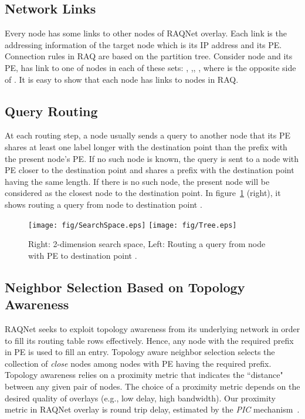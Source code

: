 \documentclass {article}
\begin{document}
\subsection{Network Links}
Every node has some links to other nodes of RAQNet overlay. Each link
is  the addressing information of the target node which is its
IP address and its PE. Connection rules in RAQ are based on the partition
tree. Consider node  and its PE,  has link to one of nodes
in each of these sets: ,
,,   , where 
is the opposite side of . It is easy to show
 that each node has links to  nodes in
RAQ.
\subsection{Query Routing }
At each routing step, a node usually sends a query to another
node that its PE shares at least one label longer with the destination
point  than the prefix with the present node's PE. If no such node is
known, the query is sent to a node with PE closer to the
destination point and shares a prefix with the destination point
having  the same length. If there is no such node, the present node will be considered as the closest node to the destination point. In figure~\ref{fig:fig1} (right), it shows routing a query from node  to destination point .
\begin{figure}[ht]
\texttt{[image: fig/SearchSpace.eps]}
\hspace{.01cm}
\texttt{[image: fig/Tree.eps]}
\caption{Right: 2-dimension search space, Left: Routing a query from node  with PE  to destination point .}
\label{fig:fig1}
\end{figure}
\subsection{Neighbor Selection Based on Topology Awareness}\label{neighbor selection}
RAQNet seeks to
exploit topology awareness from its underlying network in order to
fill its routing table rows effectively.
 Hence, any node with the
required prefix in PE is used to fill an entry.
Topology aware
neighbor selection selects the collection of \emph{close} nodes among nodes with PE having the required prefix. Topology
awareness relies on a  proximity metric that indicates the
``distance" between any given pair of nodes. The choice of a
proximity metric depends on the desired quality of overlays (e.g., low delay, high bandwidth). Our proximity metric in
RAQNet overlay is round trip delay, estimated by the \emph{PIC} mechanism~\cite{PIC}.
\end{document}
